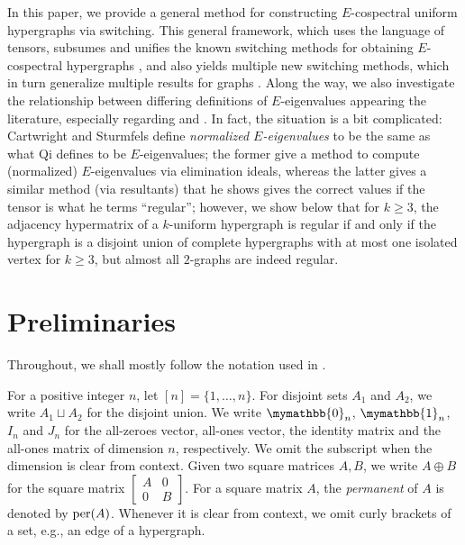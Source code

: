 \documentclass[12pt]{article}
\numberwithin{equation}{section}
\theoremstyle{definition}
\newcommand{\ev}[1]{( #1 )}
\begin{document}
In this paper, we provide a general method for constructing $E$-cospectral uniform hypergraphs via switching. This general framework, which uses the language of tensors, subsumes and unifies the known switching methods for obtaining $E$-cospectral hypergraphs \cite{bzw2014,AK2024}, and also yields multiple new switching methods, which in turn generalize multiple results for graphs \cite{abiad_haemers,mao_wang_liu_qiu_2023,ABS2025}. Along the way, we also investigate the relationship between differing definitions of $E$-eigenvalues appearing the literature, especially regarding \cite{Q2007} and \cite{CARTWRIGHT2013942}. In fact, the situation is a bit complicated: Cartwright and Sturmfels define {\em normalized $E$-eigenvalues} to be the same as what Qi defines to be $E$-eigenvalues; the former give a method to compute (normalized) $E$-eigenvalues via elimination ideals, whereas the latter gives a similar method (via resultants) that he shows gives the correct values if the tensor is what he terms ``regular''; however, we show below that for $k\geq 3$, the adjacency hypermatrix of a $k$-uniform hypergraph is regular if and only if the hypergraph is a disjoint union of complete hypergraphs with at most one isolated vertex for $k \geq 3$, but almost all $2$-graphs are indeed regular.

\section{Preliminaries}


Throughout, we shall mostly follow the notation used in \cite{bzw2014}.

For a positive integer $n$, let $[n] = \{1, \ldots , n\}$. For disjoint sets $A_1$ and $A_2$, we write $A_1 \sqcup A_2$ for the disjoint union. We write $\mymathbb{0}_n$, $\mymathbb{1}_n$, $I_n$ and $J_n$ for the all-zeroes vector, all-ones vector, the identity matrix and the all-ones matrix of dimension $n$, respectively. We omit the subscript when the dimension is clear from context. Given two square matrices $A,B$, we write $A\oplus B$ for the square matrix $\begin{bmatrix}
A & 0 \\ 0 & B
\end{bmatrix}$. For a square matrix $A$, the \textit{permanent} of $A$ is denoted by $\textup{per}\ev{A}$. Whenever it is clear from context, we omit curly brackets of a set, e.g., an edge of a hypergraph. 
\end{document}
